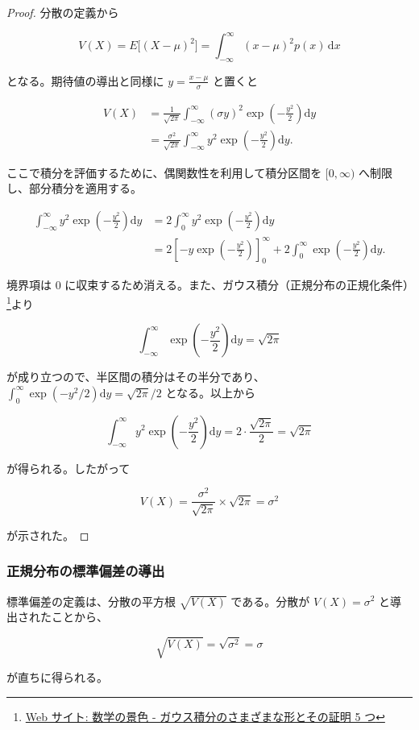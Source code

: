 \documentclass[
  11pt,
  a4paper,
]{extarticle}
\numberwithin{equation}{section}
\theoremstyle{plain}
\theoremstyle{definition}
\begin{document}
\begin{proof}
分散の定義から

$$
V(X) = E\bigl[(X-\mu)^2\bigr] = \int_{-\infty}^{\infty} (x-\mu)^2 p(x) \, \mathrm{d}x
$$

となる。期待値の導出と同様に $y = \frac{x-\mu}{\sigma}$ と置くと

\begin{align*}
V(X)
&= \frac{1}{\sqrt{2\pi}} \int_{-\infty}^{\infty} (\sigma y)^2 \exp\left(-\frac{y^2}{2}\right) \mathrm{d}y \\
&= \frac{\sigma^2}{\sqrt{2\pi}} \int_{-\infty}^{\infty} y^2 \exp\left(-\frac{y^2}{2}\right) \mathrm{d}y.
\end{align*}

ここで積分を評価するために、偶関数性を利用して積分区間を $[0, \infty)$ へ制限し、部分積分を適用する。

\begin{align*}
\int_{-\infty}^{\infty} y^2 \exp\left(-\frac{y^2}{2}\right) \mathrm{d}y
&= 2 \int_0^{\infty} y^2 \exp\left(-\frac{y^2}{2}\right) \mathrm{d}y \\
&= 2 \left[ -y \exp\left(-\frac{y^2}{2}\right) \right]_0^{\infty} + 2 \int_0^{\infty} \exp\left(-\frac{y^2}{2}\right) \mathrm{d}y.
\end{align*}

境界項は 0 に収束するため消える。また、ガウス積分（正規分布の正規化条件）\footnote{\href{https://mathlandscape.com/gauss-integral/}{Web サイト: 数学の景色 - ガウス積分のさまざまな形とその証明 5 つ}}より

$$
\int_{-\infty}^{\infty} \exp\left(-\frac{y^2}{2}\right) \mathrm{d}y = \sqrt{2\pi}
$$

が成り立つので、半区間の積分はその半分であり、$\int_0^{\infty} \exp(-y^2/2) \mathrm{d}y = \sqrt{2\pi}/2$ となる。以上から

$$
\int_{-\infty}^{\infty} y^2 \exp\left(-\frac{y^2}{2}\right) \mathrm{d}y = 2 \cdot \frac{\sqrt{2\pi}}{2} = \sqrt{2\pi}
$$

が得られる。したがって

$$
V(X) = \frac{\sigma^2}{\sqrt{2\pi}} \times \sqrt{2\pi} = \sigma^2
$$

が示された。
\end{proof}

\newpage

\subsubsection{正規分布の標準偏差の導出}\label{ux6b63ux898fux5206ux5e03ux306eux6a19ux6e96ux504fux5deeux306eux5c0eux51fa}

標準偏差の定義は、分散の平方根 \(\sqrt{V(X)}\) である。分散が
\(V(X) = \sigma^2\) と導出されたことから、

\[
\sqrt{V(X)} = \sqrt{\sigma^2} = \sigma
\]

が直ちに得られる。
\end{document}
